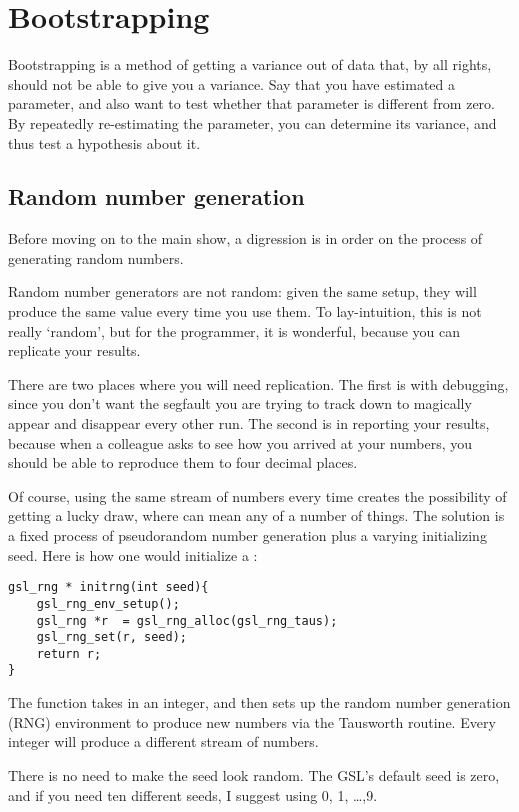 \chapter{Bootstrapping} \label{boot}

Bootstrapping is a method of getting a variance out of data that, by all
rights, should not be able to give you a variance. Say that you have
estimated a parameter, and also want to test whether that parameter is
different from zero. By repeatedly re-estimating the parameter, you can
determine its variance, and thus test a hypothesis about it.

\section{Random number generation}\label{randomnumbers}
Before moving on to the main show, a digression is in order on the
process of generating random numbers. 

Random number generators are not random: given the same setup, they
will produce the same value every time you use them. To lay-intuition,
this is not really `random', but for the programmer, it is wonderful,
because you can replicate your results.

There are two places where you will need replication. The first is with
debugging, since you don't want the segfault you are trying to track
down to magically appear and disappear every other run. The second is
in reporting your results, because when a colleague asks to see how you
arrived at your numbers, you should be able to reproduce them to four
decimal places.

Of course, using the same stream of numbers every time creates the
possibility of getting a lucky draw, where  can mean any of a
number of things. The solution is a fixed process of pseudorandom
number generation plus a varying initializing seed. Here is how one
would initialize a :
\begin{lstlisting}
gsl_rng * initrng(int seed){
    gsl_rng_env_setup();
    gsl_rng *r  = gsl_rng_alloc(gsl_rng_taus);
    gsl_rng_set(r, seed);  
    return r;
}
\end{lstlisting}
The function takes in an integer, and then sets up the random number
generation (RNG) environment to produce new numbers via the Tausworth
routine. Every integer will produce a different stream of numbers.

There is no need to make the seed look random. The GSL's default seed is
zero, and if you need ten different seeds, I suggest using 0, 1, \dots ,9.

